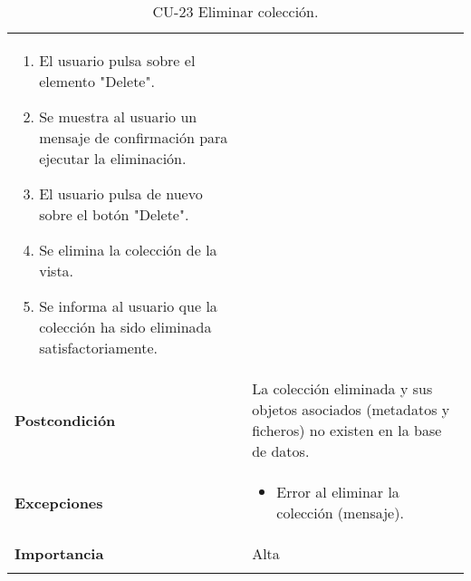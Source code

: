 \begin{longtable}[]{@{}ll@{}}
\begin{minipage}[t]{0.75\columnwidth}
\begin{enumerate}
\def\labelenumi{\arabic{enumi}.}
\tightlist
\item
  El usuario pulsa sobre el elemento "Delete".
\item
  Se muestra al usuario un mensaje de confirmación para ejecutar la
  eliminación.
\item
  El usuario pulsa de nuevo sobre el botón "Delete".
\item
  Se elimina la colección de la vista.
\item
  Se informa al usuario que la colección ha sido eliminada
  satisfactoriamente.
\end{enumerate}\strut
\end{minipage}\tabularnewline
\begin{minipage}[t]{0.19\columnwidth}\raggedright
\textbf{Postcondición}\strut
\end{minipage} & \begin{minipage}[t]{0.75\columnwidth}\raggedright
La colección eliminada y sus objetos asociados (metadatos y ficheros) no
existen en la base de datos.\strut
\end{minipage}\tabularnewline
\begin{minipage}[t]{0.19\columnwidth}\raggedright
\textbf{Excepciones}\strut
\end{minipage} & \begin{minipage}[t]{0.75\columnwidth}\raggedright
\begin{itemize}
\tightlist
\item
  Error al eliminar la colección (mensaje).
\end{itemize}\strut
\end{minipage}\tabularnewline
\begin{minipage}[t]{0.19\columnwidth}\raggedright
\textbf{Importancia}\strut
\end{minipage} & \begin{minipage}[t]{0.75\columnwidth}\raggedright
Alta\strut
\end{minipage}\tabularnewline
\bottomrule
\caption{CU-23 Eliminar colección.}
\end{longtable}

